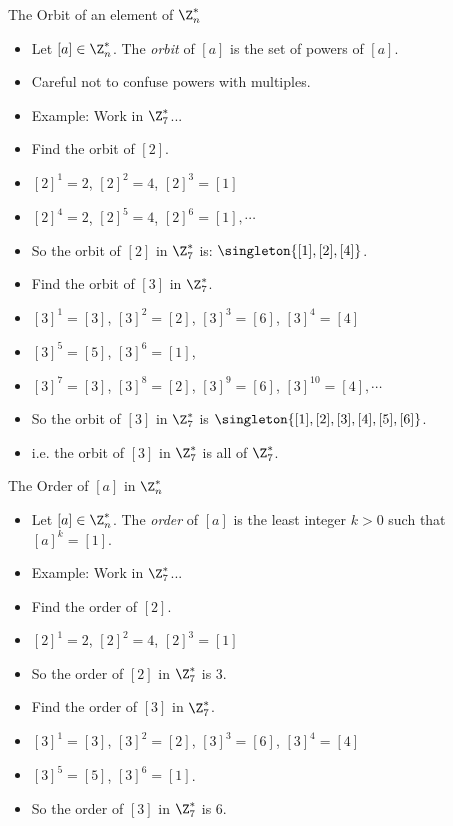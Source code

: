 \documentclass{beamer}
\begin{document}
\begin{frame}{The Orbit of an element of $\Z_n^*$}

\begin{itemize}
  \item Let $[a]\in\Z^*_n$. The \emph{orbit} of $[a]$ is
  the set of powers of $[a]$.
  \item Careful not to confuse powers with multiples.
  \item Example: Work in $\Z^*_7$...
  \item Find the orbit of $[2]$.
  \item $[2]^1 = 2$, $[2]^2 = 4$, $[2]^3=[1]$
  \item $[2]^4 = 2$, $[2]^5 = 4$, $[2]^6=[1], \cdots$
  \item So the orbit of $[2]$ in $\Z^*_7$ is: $\singleton{[1],[2],[4]}$.
  \item Find the orbit of $[3]$ in $\Z^*_7$.
  \item $[3]^1=[3]$, $[3]^2=[2]$, $[3]^3=[6]$, $[3]^4=[4]$
  \item $[3]^5=[5]$, $[3]^6=[1]$,
  \item $[3]^7=[3]$, $[3]^8=[2]$, $[3]^9=[6]$, $[3]^{10}=[4],\cdots$
  \item So the orbit of $[3]$ in $\Z^*_7$ is $\singleton{[1],[2],[3],[4],[5],[6]}$.
  \item i.e. the orbit of $[3]$ in $\Z^*_7$ is all of $\Z^*_7$.
\end{itemize}

\end{frame}

\begin{frame}{The Order of $[a]$ in $\Z_n^*$}

\begin{itemize}
  \item Let $[a]\in\Z^*_n$. The \emph{order} of $[a]$ is
  the least integer $k>0$ such that $[a]^k=[1]$.
  \item Example: Work in $\Z^*_7$...
  \item Find the order of $[2]$.
  \item $[2]^1 = 2$, $[2]^2 = 4$, $[2]^3=[1]$
  \item So the order of $[2]$ in $\Z^*_7$ is 3.
  \item Find the order of $[3]$ in $\Z^*_7$.
  \item $[3]^1=[3]$, $[3]^2=[2]$, $[3]^3=[6]$, $[3]^4=[4]$
  \item $[3]^5=[5]$, $[3]^6=[1]$.
  \item So the order of $[3]$ in $\Z^*_7$ is 6.
\end{itemize}

\end{frame}
\end{document}
